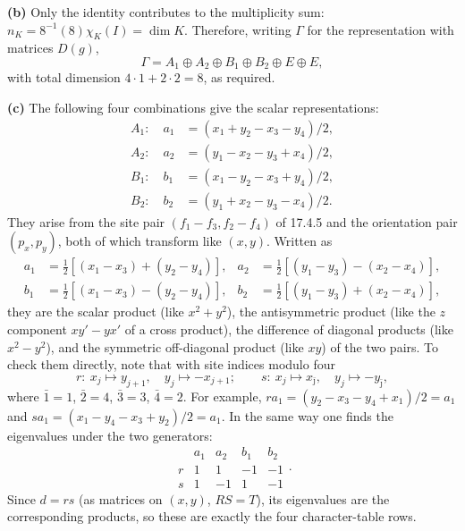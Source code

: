 \textbf{(b)} Only the identity contributes to the multiplicity sum:
$n_K=8^{-1}(8)\chi_K(I)=\dim K$.
Therefore, writing $\Gamma$ for the representation with matrices $D(g)$,
\[
\boxed{\Gamma=A_1\oplus A_2\oplus B_1\oplus B_2\oplus E\oplus E},
\]
with total dimension $4\cdot1+2\cdot2=8$, as required.

\textbf{(c)} The following four combinations give the scalar
representations:
\[
\boxed{\begin{aligned}
A_1:\quad a_1&=(x_1+y_2-x_3-y_4)/2,\\
A_2:\quad a_2&=(y_1-x_2-y_3+x_4)/2,\\
B_1:\quad b_1&=(x_1-y_2-x_3+y_4)/2,\\
B_2:\quad b_2&=(y_1+x_2-y_3-x_4)/2.
\end{aligned}}
\]
They arise from the site pair $(f_1-f_3,f_2-f_4)$ of 17.4.5 and
the orientation pair $(p_x,p_y)$, both of which transform like
$(x,y)$. Written as
\[
\begin{aligned}
a_1&=\tfrac12[(x_1-x_3)+(y_2-y_4)],&
a_2&=\tfrac12[(y_1-y_3)-(x_2-x_4)],\\
b_1&=\tfrac12[(x_1-x_3)-(y_2-y_4)],&
b_2&=\tfrac12[(y_1-y_3)+(x_2-x_4)],
\end{aligned}
\]
they are the scalar product (like $x^2+y^2$), the antisymmetric
product (like the $z$ component $xy'-yx'$ of a cross product), the
difference of diagonal products (like $x^2-y^2$), and
the symmetric off-diagonal product (like $xy$) of the two pairs.
To check them directly, note that with site indices modulo four
\[
r:\ x_j\mapsto y_{j+1},\quad y_j\mapsto-x_{j+1};\qquad
s:\ x_j\mapsto x_{\bar\jmath},\quad y_j\mapsto-y_{\bar\jmath},
\]
where $\bar1=1$, $\bar2=4$, $\bar3=3$, $\bar4=2$. For example,
$ra_1=(y_2-x_3-y_4+x_1)/2=a_1$ and
$sa_1=(x_1-y_4-x_3+y_2)/2=a_1$. In the same way one finds the
eigenvalues under the two generators:
\[
\begin{array}{c|rrrr}
&a_1&a_2&b_1&b_2\\\hline
r&1&1&-1&-1\\
s&1&-1&1&-1
\end{array}.
\]
Since $d=rs$ (as matrices on $(x,y)$, $RS=T$), its eigenvalues
are the corresponding products, so these are exactly the four
character-table rows.


